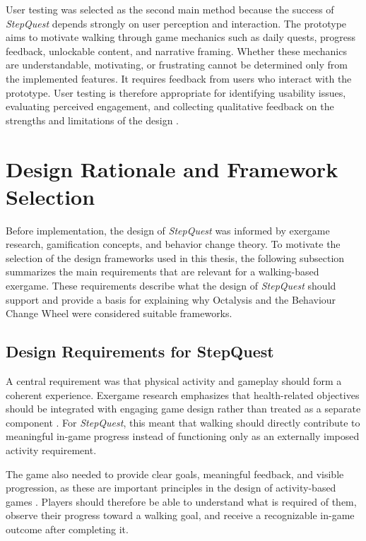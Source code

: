 User testing was selected as the second main method because the success of \textit{StepQuest} depends strongly on user perception and interaction. The prototype aims to motivate walking through game mechanics such as daily quests, progress feedback, unlockable content, and narrative framing. Whether these mechanics are understandable, motivating, or frustrating cannot be determined only from the implemented features. It requires feedback from users who interact with the prototype. User testing is therefore appropriate for identifying usability issues, evaluating perceived engagement, and collecting qualitative feedback on the strengths and limitations of the design \cite{Nielsen1994UsabilityEngineering,Lazar2017HCIResearchMethods}.

\section{Design Rationale and Framework Selection}

Before implementation, the design of \textit{StepQuest} was informed by exergame research, gamification concepts, and behavior change theory. To motivate the selection of the design frameworks used in this thesis, the following subsection summarizes the main requirements that are relevant for a walking-based exergame. These requirements describe what the design of \textit{StepQuest} should support and provide a basis for explaining why Octalysis and the Behaviour Change Wheel were considered suitable frameworks.

\subsection{Design Requirements for StepQuest}

A central requirement was that physical activity and gameplay should form a coherent experience. Exergame research emphasizes that health-related objectives should be integrated with engaging game design rather than treated as a separate component \cite{Kubota2022Pilot}. For \textit{StepQuest}, this meant that walking should directly contribute to meaningful in-game progress instead of functioning only as an externally imposed activity requirement.

The game also needed to provide clear goals, meaningful feedback, and visible progression, as these are important principles in the design of activity-based games \cite{10.1145/1321261.1321313,Kubota2022Pilot}. Players should therefore be able to understand what is required of them, observe their progress toward a walking goal, and receive a recognizable in-game outcome after completing it.

